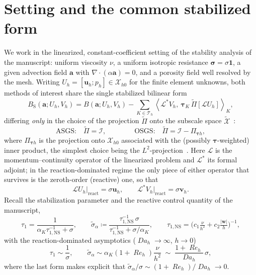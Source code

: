 \documentclass[11pt]{article}
\newcommand{\Reyn}{\operatorname{\mathit{Re}}}
\newcommand{\Damk}{\operatorname{\mathit{Da}}}
\newcommand{\dualpairing}[1]{\left\langle #1\right\rangle}
\theoremstyle{plain}
\theoremstyle{remark}
\newcommand{\uh}{\boldsymbol{u}_h}
\newcommand{\ph}{p_h}
\newcommand{\Uh}{U_h}
\newcommand{\Vh}{V_h}
\newcommand{\Th}{\mathcal{T}_h}
\newcommand{\Xh}{\mathcal{X}_{h0}}
\newcommand{\Pio}{\Pi_{\boldsymbol{\tau}h}}            %
\newcommand{\Porth}{\widetilde{\Pi}}                  %
\newcommand{\siga}{\widetilde{\sigma}_\alpha}
\newcommand{\tauNS}{\tau_{1,\mathrm{NS}}}
\begin{document}
\section{Setting and the common stabilized form}
We work in the linearized, constant-coefficient setting of the stability analysis
of the manuscript: uniform viscosity $\nu$, a uniform isotropic resistance
$\boldsymbol{\sigma}=\sigma\boldsymbol{1}$, a given advection field $\boldsymbol{a}$
with $\nabla\!\cdot(\alpha\boldsymbol{a})=0$, and a porosity field well resolved by
the mesh. Writing $\Uh=[\uh;\ph]\in\Xh$ for the finite element unknowns, both
methods of interest share the single stabilized bilinear form
%
\begin{equation}\label{eq:BS}
  B_\mathrm{S}(\boldsymbol{a};\Uh,\Vh)
  = B(\boldsymbol{a};\Uh,\Vh)
  - \sum_{K\in\Th}\dualpairing{\mathcal{L}^*\Vh,\ \boldsymbol{\tau}_K\,\Porth\!\left[\mathcal{L}\Uh\right]}_K ,
\end{equation}
%
differing \emph{only} in the choice of the projection $\Porth$ onto the subscale
space $\widetilde{\mathcal{X}}$~\cite{codina2018variational,hughes2007variational}:
%
\begin{equation}\label{eq:choices}
  \text{ASGS:}\quad \Porth=\mathcal{I},
  \qquad\qquad
  \text{OSGS:}\quad \Porth=\mathcal{I}-\Pio ,
\end{equation}
%
where $\Pio$ is the projection onto $\Xh$ associated with the (possibly
$\boldsymbol{\tau}$-weighted) inner product, the simplest choice being the
$L^2$-projection~\cite{codina2002stabilized}. Here $\mathcal{L}$ is the
momentum--continuity operator of the linearized problem and $\mathcal{L}^*$ its
formal adjoint; in the reaction-dominated regime the only piece of either operator
that survives is the zeroth-order (reactive) one, so that
%
\begin{equation}\label{eq:reactive-part}
  \mathcal{L}\Uh\big|_{\mathrm{react}} = \sigma\uh,
  \qquad
  \mathcal{L}^*\Vh\big|_{\mathrm{react}} = \sigma\boldsymbol{v}_h .
\end{equation}
%
Recall the stabilization parameter and the reactive control quantity of the
manuscript,
%
\begin{equation}\label{eq:tau1-siga}
  \tau_1=\frac{1}{\alpha_K\tauNS^{-1}+\sigma},
  \qquad
  \siga\coloneqq\frac{\tauNS^{-1}\,\sigma}{\tauNS^{-1}+\sigma/\alpha_K},
  \qquad
  \tauNS=\Big(c_1\tfrac{\nu}{h^2}+c_2\tfrac{|\boldsymbol{w}|}{h}\Big)^{-1},
\end{equation}
%
with the reaction-dominated asymptotics ($\Damk_h\to\infty$, $h\to0$)
%
\begin{equation}\label{eq:asymp}
  \tau_1\sim\frac{1}{\sigma},
  \qquad
  \siga\sim\alpha_K(1+\Reyn_h)\frac{\nu}{h^2}
  \;\sim\;\frac{1+\Reyn_h}{\Damk_h}\,\sigma,
\end{equation}
%
where the last form makes explicit that $\siga/\sigma\sim(1+\Reyn_h)/\Damk_h\to0$.
\end{document}
